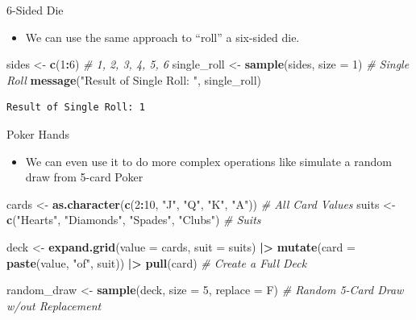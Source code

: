 \documentclass[
  ignorenonframetext,
]{beamer}
\newenvironment{Shaded}{\begin{snugshade}}{\end{snugshade}}
\newcommand{\AttributeTok}[1]{\textcolor[rgb]{0.13,0.29,0.53}{#1}}
\newcommand{\CommentTok}[1]{\textcolor[rgb]{0.56,0.35,0.01}{\textit{#1}}}
\newcommand{\DecValTok}[1]{\textcolor[rgb]{0.00,0.00,0.81}{#1}}
\newcommand{\FunctionTok}[1]{\textcolor[rgb]{0.13,0.29,0.53}{\textbf{#1}}}
\newcommand{\NormalTok}[1]{#1}
\newcommand{\OtherTok}[1]{\textcolor[rgb]{0.56,0.35,0.01}{#1}}
\newcommand{\SpecialCharTok}[1]{\textcolor[rgb]{0.81,0.36,0.00}{\textbf{#1}}}
\newcommand{\StringTok}[1]{\textcolor[rgb]{0.31,0.60,0.02}{#1}}
\providecommand{\tightlist}{%
  \setlength{\itemsep}{0pt}\setlength{\parskip}{0pt}}
\begin{document}
\begin{frame}[fragile]{6-Sided Die}
\label{sided-die}
\begin{itemize}
\tightlist
\item
  We can use the same approach to ``roll'' a six-sided die.
\end{itemize}

\begin{Shaded}
\begin{Highlighting}[]
\NormalTok{sides }\OtherTok{\textless{}{-}} \FunctionTok{c}\NormalTok{(}\DecValTok{1}\SpecialCharTok{:}\DecValTok{6}\NormalTok{)  }\CommentTok{\# 1, 2, 3, 4, 5, 6}
\NormalTok{single\_roll }\OtherTok{\textless{}{-}} \FunctionTok{sample}\NormalTok{(sides, }\AttributeTok{size =} \DecValTok{1}\NormalTok{)  }\CommentTok{\# Single Roll}
\FunctionTok{message}\NormalTok{(}\StringTok{"Result of Single Roll: "}\NormalTok{, single\_roll)}
\end{Highlighting}
\end{Shaded}

\begin{verbatim}
Result of Single Roll: 1
\end{verbatim}
\end{frame}

\begin{frame}[fragile]{Poker Hands}
\label{poker-hands}
\begin{itemize}
\tightlist
\item
  We can even use it to do more complex operations like simulate a
  random draw from 5-card Poker \tiny
\end{itemize}

\begin{Shaded}
\begin{Highlighting}[]
\NormalTok{cards }\OtherTok{\textless{}{-}} \FunctionTok{as.character}\NormalTok{(}\FunctionTok{c}\NormalTok{(}\DecValTok{2}\SpecialCharTok{:}\DecValTok{10}\NormalTok{, }\StringTok{"J"}\NormalTok{, }\StringTok{"Q"}\NormalTok{, }\StringTok{"K"}\NormalTok{, }\StringTok{"A"}\NormalTok{))}
\CommentTok{\# All Card Values}
\NormalTok{suits }\OtherTok{\textless{}{-}} \FunctionTok{c}\NormalTok{(}\StringTok{"Hearts"}\NormalTok{, }\StringTok{"Diamonds"}\NormalTok{, }\StringTok{"Spades"}\NormalTok{, }\StringTok{"Clubs"}\NormalTok{)}
\CommentTok{\# Suits}

\NormalTok{deck }\OtherTok{\textless{}{-}} \FunctionTok{expand.grid}\NormalTok{(}\AttributeTok{value =}\NormalTok{ cards, }\AttributeTok{suit =}\NormalTok{ suits) }\SpecialCharTok{|\textgreater{}}
    \FunctionTok{mutate}\NormalTok{(}\AttributeTok{card =} \FunctionTok{paste}\NormalTok{(value, }\StringTok{"of"}\NormalTok{, suit)) }\SpecialCharTok{|\textgreater{}}
    \FunctionTok{pull}\NormalTok{(card)  }\CommentTok{\# Create a Full Deck}

\NormalTok{random\_draw }\OtherTok{\textless{}{-}} \FunctionTok{sample}\NormalTok{(deck, }\AttributeTok{size =} \DecValTok{5}\NormalTok{, }\AttributeTok{replace =}\NormalTok{ F)}
\CommentTok{\# Random 5{-}Card Draw w/out Replacement}
\end{Highlighting}
\end{Shaded}
\end{frame}
\end{document}
